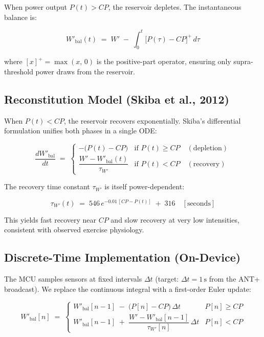\documentclass[11pt, letterpaper]{article}
\begin{document}
When power output $P(t) > CP$, the reservoir depletes. The instantaneous balance is:

\begin{equation}
  W'_{\mathrm{bal}}(t)
  \;=\;
  W' \;-\; \int_{0}^{t} \bigl[P(\tau) - CP\bigr]^{+} \, d\tau
  \label{eq:depletion}
\end{equation}

where $[x]^{+} = \max(x,\,0)$ is the positive-part operator, ensuring only supra-threshold
power draws from the reservoir.

\subsection{Reconstitution Model (Skiba et al., 2012)}

When $P(t) < CP$, the reservoir recovers exponentially. Skiba's differential formulation
unifies both phases in a single ODE:

\begin{equation}
  \frac{dW'_{\mathrm{bal}}}{dt}
  \;=\;
  \begin{cases}
    -\!\bigl(P(t) - CP\bigr)
    & \text{if } P(t) \geq CP \quad (\text{depletion}) \\[6pt]
    \dfrac{W' - W'_{\mathrm{bal}}(t)}{\tau_{W'}}
    & \text{if } P(t) < CP \quad (\text{recovery})
  \end{cases}
  \label{eq:skiba}
\end{equation}

The recovery time constant $\tau_{W'}$ is itself power-dependent:

\begin{equation}
  \tau_{W'}(t)
  \;=\;
  546\,e^{-0.01\,[CP - P(t)]} \;+\; 316
  \quad [\text{seconds}]
  \label{eq:tau}
\end{equation}

This yields fast recovery near $CP$ and slow recovery at very low intensities, consistent
with observed exercise physiology.

\subsection{Discrete-Time Implementation (On-Device)}

The MCU samples sensors at fixed intervals $\Delta t$ (target: $\Delta t = 1\,\mathrm{s}$
from the ANT+ broadcast). We replace the continuous integral with a first-order Euler
update:

\begin{equation}
  W'_{\mathrm{bal}}[n]
  \;=\;
  \begin{cases}
    W'_{\mathrm{bal}}[n-1]
    \;-\;\bigl(P[n] - CP\bigr)\,\Delta t
    & P[n] \geq CP \\[8pt]
    W'_{\mathrm{bal}}[n-1]
    \;+\;\dfrac{W' - W'_{\mathrm{bal}}[n-1]}{\tau_{W'}[n]}\,\Delta t
    & P[n] < CP
  \end{cases}
  \label{eq:discrete}
\end{equation}
\end{document}
